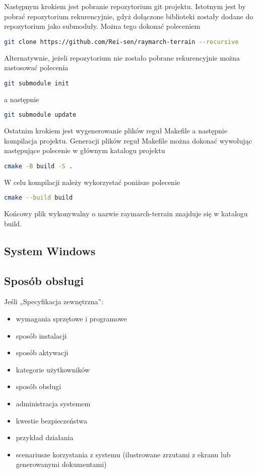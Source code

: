 Następnym krokiem jest pobranie repozytorium git projektu. Istotnym jest by pobrać repozytorium rekurencyjnie, gdyż dołączone biblioteki zostały dodane do repozytorium jako submoduły. Można tego dokonać poleceniem
\begin{lstlisting}[language=bash]
  git clone https://github.com/Rei-sen/raymarch-terrain --recursive
\end{lstlisting}
Alternatywnie, jeżeli repozytorium nie zostało pobrane rekurencyjnie można zastosować polecenia
\begin{lstlisting}[language=bash]
  git submodule init
\end{lstlisting}
a następnie
\begin{lstlisting}[language=bash]
  git submodule update
\end{lstlisting}
Ostatnim krokiem jest wygenerowanie plików reguł Makefile a następnie
kompilacja projektu. Generacji plików reguł Makefile można dokonać wywołując następujące polecenie w głównym katalogu projektu
\begin{lstlisting}[language=bash]
  cmake -B build -S .
\end{lstlisting}
W celu kompilacji należy wykorzystać poniższe polecenie
\begin{lstlisting}[language=bash]
  cmake --build build
\end{lstlisting}
Końcowy plik wykonywalny o nazwie raymarch-terrain znajduje się w katalogu build.
\subsection{System Windows}

\subsection{Sposób obsługi}


Jeśli „Specyfikacja zewnętrzna”:
\begin{itemize}
\item  wymagania sprzętowe i programowe
\item  sposób instalacji
\item  sposób aktywacji
\item  kategorie użytkowników
\item  sposób obsługi
\item  administracja systemem
\item  kwestie bezpieczeństwa
\item  przykład działania
\item  scenariusze korzystania z systemu (ilustrowane zrzutami z ekranu lub generowanymi dokumentami)
\end{itemize}

